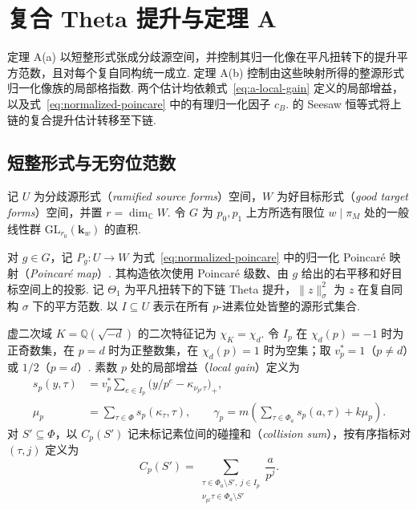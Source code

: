 \chapter{复合 Theta 提升与定理 A}
\label{chap:upperbound}

\begin{chapterguide}
定理 A(a) 以短整形式张成分歧源空间，并控制其归一化像在平凡扭转下的提升平方范数，且对每个复自同构统一成立. 定理 A(b) 控制由这些映射所得的整源形式归一化像族的局部格指数. 两个估计均依赖式~\eqref{eq:a-local-gain} 定义的局部增益，以及式~\eqref{eq:normalized-poincare} 中的有理归一化因子 $c_B$. 的 Seesaw 恒等式将上链的复合提升估计转移至下链.
\end{chapterguide}

\section{短整形式与无穷位范数}
\label{sec:a-short-basis}

记 $U$ 为分歧源形式（\emph{ramified source forms}）空间，$W$ 为好目标形式（\emph{good target forms}）空间，并置 $r=\dim_{\mathbb C}W$. 令 $G$ 为 $p_0,p_1$ 上方所选有限位 $w\mid\pi_M$ 处的一般线性群 $\mathrm{GL}_{r_0}(\mathbf k_w)$ 的直积.

对 $g\in G$，记 $P_g\colon U\to W$ 为式~\eqref{eq:normalized-poincare} 中的归一化 Poincaré 映射（\emph{Poincaré map}）. 其构造依次使用 Poincaré 级数、由 $g$ 给出的右平移和好目标空间上的投影. 记 $\Theta_1$ 为平凡扭转下的下链 Theta 提升，$\|z\|^2_\sigma$ 为 $z$ 在复自同构 $\sigma$ 下的平方范数. 以 $I\subseteq U$ 表示在所有 $p$-进素位处皆整的源形式集合.

虚二次域 $K=\mathbb Q(\sqrt{-d})$ 的二次特征记为 $\chi_K=\chi_d$. 令 $I_p$ 在 $\chi_d(p)=-1$ 时为正奇数集，在 $p=d$ 时为正整数集，在 $\chi_d(p)=1$ 时为空集；取 $v_p^*=1$（$p\ne d$）或 $1/2$（$p=d$）. 素数 $p$ 处的局部增益（\emph{local gain}）定义为
\begin{equation}\label{eq:a-local-gain}
\begin{aligned}
 s_p(y,\tau)&=v_p^*\sum_{e\in I_p}\bigl(y/p^e-\kappa_{\nu_{p^e}\tau}\bigr)_+,\\
 \mu_p&=\sum_{\tau\in\Phi}s_p(\kappa_\tau,\tau),\qquad
 \gamma_p=m\left(\sum_{\tau\in\Phi_a}s_p(a,\tau)+k\mu_p\right).
\end{aligned}
\end{equation}
对 $S'\subseteq\Phi$，以 $C_p(S')$ 记未标记素位间的碰撞和（\emph{collision sum}），按有序指标对 $(\tau,j)$ 定义为
\[
 C_p(S')=\sum_{\substack{\tau\in\Phi_a\setminus S',\ j\in I_p\\
                         \nu_{p^j}\tau\in\Phi_a\setminus S'}}\frac a{p^j}.
\]

